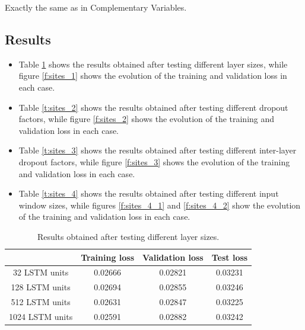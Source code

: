 \documentclass[]{article}
\begin{document}
	Exactly the same as in Complementary Variables.
	
	\subsection{Results}
	
	\begin{itemize}
		\item Table \ref{t:sites_1} shows the results obtained after testing different layer sizes, while figure \ref{f:sites_1} shows the evolution of the training and validation loss in each case.
		
		\item Table \ref{t:sites_2} shows the results obtained after testing different dropout factors, while figure \ref{f:sites_2} shows the evolution of the training and validation loss in each case.
		
		\item Table \ref{t:sites_3} shows the results obtained after testing different inter-layer dropout factors, while figure \ref{f:sites_3} shows the evolution of the training and validation loss in each case.
		
		\item Table \ref{t:sites_4} shows the results obtained after testing different input window sizes, while figures \ref{f:sites_4_1} and \ref{f:sites_4_2} show the evolution of the training and validation loss in each case.
	\end{itemize}
	
	\begin{table}[H]
		\centering
		\begin{tabular}{@{}cccc@{}}
			\toprule
			& Training loss & Validation loss & Test loss \\ \midrule
			32 LSTM units   & 0.02666       & 0.02821         & 0.03231   \\
			128 LSTM units  & 0.02694       & 0.02855         & 0.03246   \\
			512 LSTM units  & 0.02631       & 0.02847         & 0.03225   \\
			1024 LSTM units & 0.02591       & 0.02882         & 0.03242   \\ \bottomrule
		\end{tabular}
		\caption{Results obtained after testing different layer sizes.}
		\label{t:sites_1}
	\end{table}
	
\end{document}
